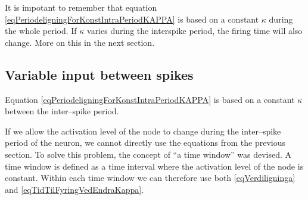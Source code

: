 It is impotant to remember that equation \eqref{eqPeriodeligningForKonstIntraPeriodKAPPA} is based on a constant $\kappa$ during the whole period. 
If $\kappa$ varies during the interspike period, the firing time will also change. More on this in the next section.



\subsection{Variable input between spikes}
\label{ssecVariableInputBetweenSpikes}
Equation \eqref{eqPeriodeligningForKonstIntraPeriodKAPPA} is based on a constant $\kappa$ between the inter--spike period.


If we allow the activation level of the node to change during the inter--spike period of the neuron, we cannot directly use %
																			the equations from the previous section.
To solve this problem, the concept of ``a time window'' was devised. A time window is defined as a time interval where the activation level of the node is constant.
Within each time window we can therefore use both \eqref{eqVerdiligninga} and \eqref{eqTidTilFyringVedEndraKappa}.

